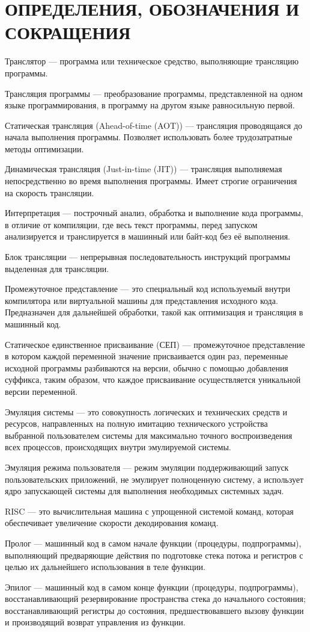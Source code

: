 \section*{ОПРЕДЕЛЕНИЯ, ОБОЗНАЧЕНИЯ И СОКРАЩЕНИЯ}

Транслятор --- программа или техническое средство, выполняющие трансляцию программы. \cite{translate}

Трансляция программы --- преобразование программы, представленной на одном языке программирования, в программу на другом языке равносильную первой. \cite{translate}

Статическая трансляция (Ahead-of-time (AOT)) --- трансляция проводящаяся до начала выполнения программы. Позволяет использовать более трудозатратные методы оптимизации.

Динамическая трансляция (Just-in-time (JIT)) --- трансляция выполняемая непосредственно во время выполнения программы. Имеет строгие ограничения на скорость трансляции.

Интерпретация --- построчный анализ, обработка и выполнение кода программы, в отличие от компиляции, где весь текст программы, перед запуском анализируется и транслируется в машинный или байт-код без её выполнения. \cite{interpret}

Блок трансляции --- непрерывная последовательность инструкций программы выделенная для трансляции.

Промежуточное представление ---  это специальный код используемый внутри компилятора или виртуальной машины для представления исходного кода. Предназначен для дальнейшей обработки, такой как оптимизация и трансляция в машинный код.

Статическое единственное присваивание (СЕП) --- промежуточное представление в котором каждой переменной значение присваивается один раз, переменные исходной программы разбиваются на версии, обычно с помощью добавления суффикса, таким образом, что каждое присваивание осуществляется уникальной версии переменной.

Эмуляция системы --- это совокупность логических и технических средств и ресурсов, направленных на полную имитацию технического устройства выбранной пользователем системы для максимально точного воспроизведения всех процессов, происходящих внутри эмулируемой системы. 

Эмуляция режима пользователя --- режим эмуляции поддерживающий запуск пользовательских приложений, не эмулирует полноценную систему, а использует ядро запускающей системы для выполнения необходимых системных задач.

RISC --- это вычислительная машина с упрощенной системой команд, которая обеспечивает увеличение скорости декодирования команд. \cite{it_dict}

Пролог --- машинный код в самом начале функции (процедуры, подпрограммы), выполняющий предваряющие действия по подготовке стека потока и регистров с целью их дальнейшего использования в теле функции.

Эпилог --- машинный код в самом конце функции (процедуры, подпрограммы), восстанавливающий резервирование пространства стека до начального состояния; восстанавливающий регистры до состояния, предшествовавшего вызову функции и производящий возврат управления из функции.

\pagebreak